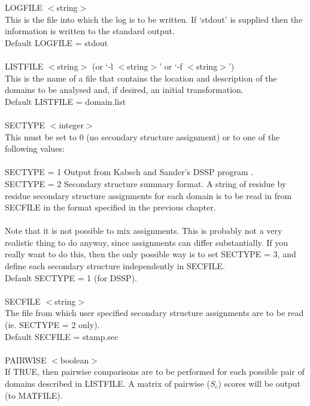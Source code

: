     LOGFILE $<$string$>$\\
    This is the file into which the log is to be written.  If
    `stdout' is supplied then the information is written to the
    standard output.\\
    Default LOGFILE = stdout\\
    \\
    LISTFILE $<$string$>$ (or `-l $<$string$>$' or `-f $<$string$>$')\\
    This is the name of a file that contains the location and
    description of the domains to be analysed and, if desired, an
    initial transformation.\\  
    Default LISTFILE = domain.list\\
    \\
    SECTYPE $<$integer$>$\\
    This must be set to 0 (no secondary structure assignment) or
    to one of the following values:\\
    \\
    SECTYPE = 1 Output from Kabsch and Sander's DSSP program \cite{dssp}.
    \\
    SECTYPE = 2 Secondary structure summary format.  A string of residue by
    residue secondary structure assignments for each domain is to be 
    read in from SECFILE in the format specified in the previous chapter.\\
    \\
    Note that it is not possible to mix assignments.  This is probably
    not a very realistic thing to do anyway, since assignments can
    differ substantially.  If you really want to do this, then the only
    possible way is to set SECTYPE = 3, and define each secondary structure
    independently in SECFILE.\\
    Default SECTYPE = 1 (for DSSP).\\
    \\
    SECFILE $<$string$>$\\
    The file from which user specified secondary structure assignments
    are to be read (ie. SECTYPE = 2 only).\\
    Default SECFILE = stamp.sec\\
    \\
    PAIRWISE $<$boolean$>$\\
    If TRUE, then pairwise comparisons are to be performed for each 
    possible pair of domains described in LISTFILE.  A matrix of
    pairwise ($S_{c}$) scores will be output (to MATFILE).\\
